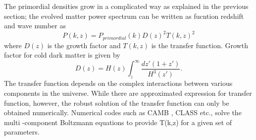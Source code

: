 The primordial densities grow in a complicated way as explained in the previous section; the evolved matter power spectrum can be written as fucntion redshift and wave number as
\begin{equation}
P(k,z) = P_{primordial} (k) D(z)^{2} T(k,z)^{2}
\end{equation}
where $D(z)$ is the growth factor and $T(k,z)$ is the transfer function. 
Growth factor for cold dark matter is given by
\begin{equation}
D(z) = H(z) \int^{\infty}_{z} \frac{dz'(1+z')}{H^{3}(z')}.
\end{equation}
The transfer function depends on the complex interactions between various components in the universe. 
While there are approximated expression for transfer function, however, the robust solution of the transfer function can only be obtained numerically. 
Numerical codes such as CAMB \citep{lewis00}, CLASS \citep{seljak96} etc., solve the multi -component Boltzmann equations to provide T(k,z) for a given set of parameters. 


